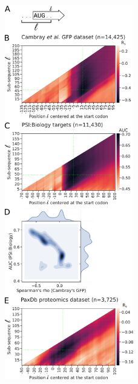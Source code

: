 \begin{figure}
	\includegraphics[width=0.5\textwidth]{chapters/TIsigner/Figs/fig2.png}

\end{figure}
